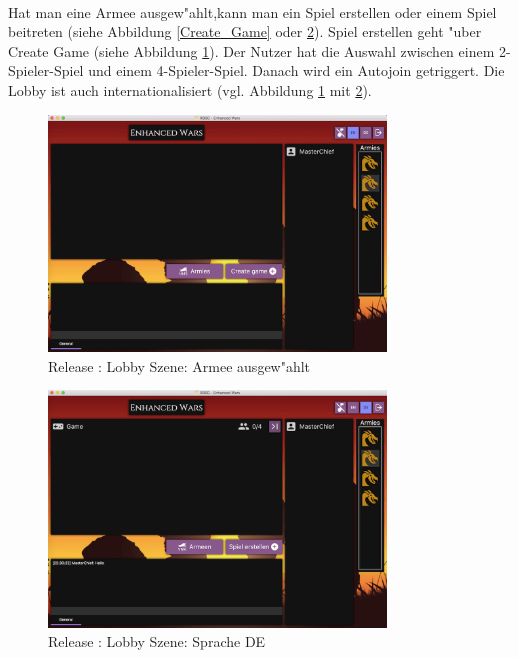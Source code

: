\documentclass[12pt, titlepage]{scrartcl}
\newcommand{\RN}[1]{%
	\textup{\uppercase\expandafter{\romannumeral#1}}%
}
\begin{document}
			    \ \vspace{0.5cm} \\ Hat man eine Armee ausgew"ahlt,kann man ein Spiel erstellen oder einem Spiel beitreten (siehe Abbildung \ref{Create_Game} oder \ref{Lobby_Language}). Spiel erstellen geht "uber Create Game (siehe Abbildung \ref{Lobby_Army_Selected}). Der Nutzer hat die Auswahl zwischen einem 2-Spieler-Spiel und einem 4-Spieler-Spiel. Danach wird ein Autojoin getriggert. Die Lobby ist auch internationalisiert (vgl. Abbildung \ref{Lobby_Army_Selected} mit \ref{Lobby_Language}). \\
			    \begin{figure}[H] 
    				\centering
    				\includegraphics[width=0.8\textwidth]{images/old_state/lobby/ArmySelected.png}
    				\caption{Release \RN{2}: Lobby Szene: Armee ausgew"ahlt}
    				\label{Lobby_Army_Selected}
			    \end{figure}
			    \begin{figure}[H] 
    				\centering
    				\includegraphics[width=0.8\textwidth]{images/old_state/lobby/International+Chat+GameCreated.png}
    				\caption{Release \RN{2}: Lobby Szene: Sprache DE}
    				\label{Lobby_Language}
			    \end{figure}
\end{document}
